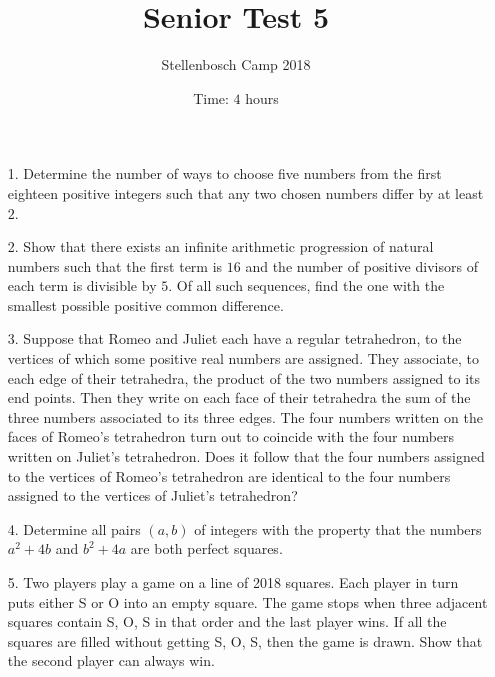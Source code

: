 \documentclass[a4paper, 12pt]{article}
\title{Senior Test 5}
\author{Stellenbosch Camp 2018}
\date{Time: $4$ hours}
\begin{document}
 \maketitle

\begin{enumerate}

\item[1.] Determine the number of ways to choose five numbers from the first eighteen positive integers such that any two chosen numbers differ by at least $2$.


\vspace{6pt}

\item[2.]  Show that there exists an infinite arithmetic progression of natural numbers such that the first term is $16$ and the number of positive divisors of each term is divisible by $5$. Of all such sequences, find the one with the smallest possible positive common difference.


\vspace{6pt}

% 
\item[3.]      Suppose that Romeo and Juliet each have a regular tetrahedron, to the vertices of which some positive real numbers are assigned. They associate, to each edge of their tetrahedra, the product of the two numbers assigned to its end points. Then they write on each face of their tetrahedra the sum of the three numbers associated to its three edges. The four numbers written on the faces of Romeo’s tetrahedron turn out to coincide with the four numbers written on Juliet’s tetrahedron. Does it follow that the four numbers assigned to the vertices of Romeo’s tetrahedron are identical to the four numbers assigned to the vertices of Juliet’s tetrahedron?



\vspace{6pt}

\item[4.] Determine all pairs $(a,b)$ of integers with the property that the numbers $a^2+4b$ and $b^2+4a$ are both perfect squares.


\vspace{6pt}

\item[5.]   Two players play a game on a line of 2018 squares. Each player in turn puts either S or O into an empty square. The game stops when three adjacent squares contain S, O, S in that order and the last player wins. If all the squares are filled without getting S, O, S, then the game is drawn. Show that the second player can always win.



\end{enumerate}
\end{document}
